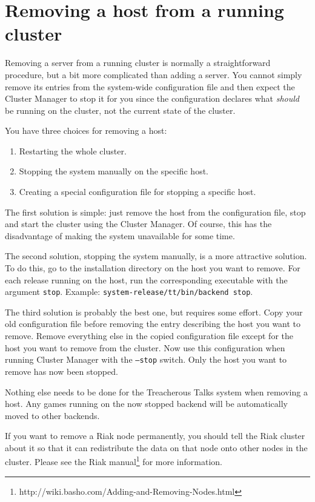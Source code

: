 \documentclass[11pt,a4paper]{report}
\begin{document}
\section{Removing a host from a running cluster}
Removing a server from a running cluster is normally a straightforward
procedure, but a bit more complicated than adding a server. You cannot simply
remove its entries from the system-wide configuration file and then expect the
Cluster Manager to stop it for you since the configuration declares what
\emph{should} be running on the cluster, not the current state of the cluster.

You have three choices for removing a host:
\begin{enumerate}
  \item Restarting the whole cluster.
  \item Stopping the system manually on the specific host.
  \item Creating a special configuration file for stopping a specific host.
\end{enumerate}

The first solution is simple: just remove the host from the configuration file,
stop and start the cluster using the Cluster Manager. Of course, this has the
disadvantage of making the system unavailable for some time.

\begin{sloppypar}
The second solution, stopping the system manually, is a more attractive
solution. To do this, go to the installation directory on the host you want to
remove. For each release running on the host, run the corresponding executable
with the argument {\tt stop}. Example: {\tt system-release/tt/bin/backend
  stop}.
\end{sloppypar}

The third solution is probably the best one, but requires some effort. Copy your
old configuration file before removing the entry describing the host you want to
remove. Remove everything else in the copied configuration file except for the
host you want to remove from the cluster. Now use this configuration when
running Cluster Manager with the {\tt --stop} switch. Only the host you want to
remove has now been stopped.

Nothing else needs to be done for the Treacherous Talks system when removing a
host. Any games running on the now stopped backend will be automatically moved
to other backends.

If you want to remove a Riak node permanently, you should tell the Riak cluster
about it so that it can redistribute the data on that node onto other nodes in
the cluster. Please see the Riak manual\footnote{http://wiki.basho.com/Adding-and-Removing-Nodes.html}
for more information.
\end{document}
